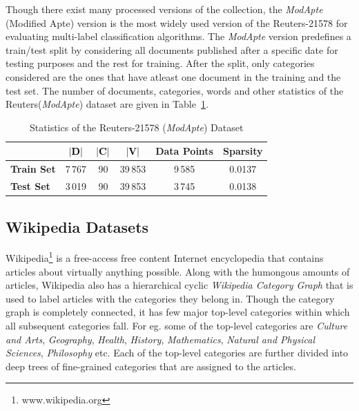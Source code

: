 Though there exist many processed versions of the collection, the \emph{ModApte} (Modified Apte) version is the most widely used version of the Reuters-21578 for evaluating multi-label classification algorithms. The \emph{ModApte} version predefines a train/test split by considering all documents published after a specific date for testing purposes and the rest for training. After the split, only categories considered are the ones that have atleast one document in the training and the test set. The number of documents, categories, words and other statistics of the Reuters(\emph{ModApte}) dataset are given in Table~\ref{reuter:data:stat}.

\begin{table}[h!]
\begin{center}
\begin{tabular}{l c c c c c} %
\toprule
& \textbf{$|\mathbf{D}|$} & \textbf{$|\mathbf{C}|$} & \textbf{$|\mathbf{V}|$} & \textbf{Data Points} & \textbf{Sparsity}\\
\midrule
\textbf{Train Set}	& 7\,767 & 90 & 39\,853 & 9\,585 & 0.0137 \\
\textbf{Test Set}	& 3\,019 & 90 & 39\,853 & 3\,745 & 0.0138 \\
\bottomrule         
\end{tabular}
\caption{\label{reuter:data:stat}Statistics of the Reuters-21578 (\emph{ModApte}) Dataset}
\end{center}
\end{table}

\subsection{Wikipedia Datasets}
Wikipedia\footnote{www.wikipedia.org} is a free-access free content Internet encyclopedia that contains articles about virtually anything possible. Along with the humongous amounts of articles, Wikipedia also has a hierarchical cyclic \emph{Wikipedia Category Graph} that is used to label articles with the categories they belong in. 
Though the category graph is completely connected, it has few major top-level categories within which all subsequent categories fall. For eg. some of the top-level categories are \emph{Culture and Arts}, \emph{Geography}, \emph{Health}, \emph{History}, \emph{Mathematics}, \emph{Natural and Physical Sciences}, \emph{Philosophy} etc. Each of the top-level categories are further divided into deep trees of fine-grained categories that are assigned to the articles. 

